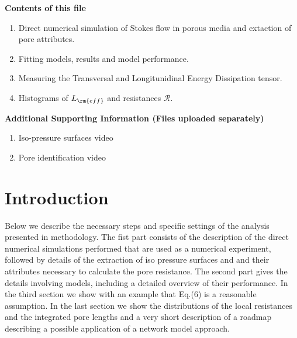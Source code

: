 \documentclass[draft,jgrga]{agutexSI2019}
\begin{document}
\begin{article}

%
%



\noindent\textbf{Contents of this file}
\begin{enumerate}
\item Direct numerical simulation of Stokes flow in porous media and extaction of pore attributes.
\item Fitting models, results and model performance.
\item Measuring the Transversal and Longitunidinal Energy Dissipation tensor.
\item Histograms of $L_{\rm{eff}}$ and resistances $\mathcal{R}$.
\end{enumerate}
\noindent\textbf{Additional Supporting Information (Files uploaded separately)}
\begin{enumerate}
\item Iso-pressure surfaces video
\item Pore identification video
\end{enumerate}

\section*{Introduction}


Below we describe the necessary steps and specific settings of the analysis presented in methodology. The fist part consists of the description of the direct numerical simulations performed that are used as a numerical experiment, followed by details of the extraction of iso pressure surfaces and and their attributes necessary to calculate the pore resistance. The second part gives the details involving models, including a detailed overview of their performance. In the third section we show with an example that Eq.(6) is a reasonable assumption. In the last section we show the distributions of the local resistances and the integrated pore lengths and a very short description of a roadmap describing a possible application of a network model approach. 



\end{article}
\end{document}
